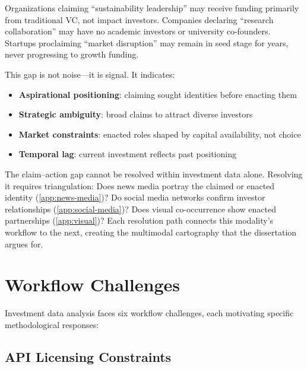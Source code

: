 \documentclass[../main.tex]{subfiles}
\begin{document}
Organizations claiming ``sustainability leadership'' may receive funding
primarily from traditional VC, not impact investors.
Companies declaring ``research collaboration'' may have no academic investors
or university co-founders.
Startups proclaiming ``market disruption'' may remain in seed stage for years,
never progressing to growth funding.

This gap is not noise---it is signal.
It indicates:

\begin{itemize}[leftmargin=*, itemsep=0.2em]
\item \textbf{Aspirational positioning}: claiming sought identities before enacting them
\item \textbf{Strategic ambiguity}: broad claims to attract diverse investors
\item \textbf{Market constraints}: enacted roles shaped by capital availability, not choice
\item \textbf{Temporal lag}: current investment reflects past positioning
\end{itemize}

\begin{criticalbox}
The claim--action gap cannot be resolved within investment data alone.
Resolving it requires triangulation:
Does news media portray the claimed or enacted identity (\cref{app:news-media})?
Do social media networks confirm investor relationships (\cref{app:social-media})?
Does visual co-occurrence show enacted partnerships (\cref{app:visual})?
Each resolution path connects this modality's workflow to the next,
creating the multimodal cartography that the dissertation argues for.
\end{criticalbox}


\section{Workflow Challenges}
\label{sec:crunchbase-challenges}

Investment data analysis faces six workflow challenges,
each motivating specific methodological responses:

\subsection{API Licensing Constraints}
\end{document}
